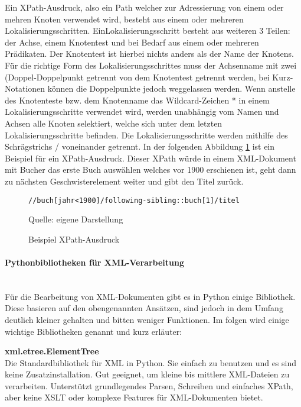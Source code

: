 Ein XPath-Ausdruck, also ein Path welcher zur Adressierung von einem oder mehren Knoten verwendet wird,
besteht aus einem oder mehreren Lokalisierungsschritten.
EinLokalisierungsschritt besteht aus weiteren 3 Teilen: der Achse, einem Knotentest und bei Bedarf aus einem oder mehreren Prädikaten.
Der Knotentest ist hierbei nichts anders als der Name der Knotens.
Für die richtige Form des Lokalisierungsschrittes muss der Achsenname mit zwei
(Doppel-Doppelpunkt getrennt von dem Knotentest getrennt werden, bei Kurz-Notationen können die Doppelpunkte jedoch weggelassen werden.
Wenn anstelle des Knotenteste bzw.
dem Knotenname das Wildcard-Zeichen * in einem Lokalisierungsschritte verwendet wird,
werden unabhängig vom Namen und Achsen alle Knoten selektiert, welche sich unter dem letzten Lokalisierungsschritte befinden.
Die Lokalisierungsschritte werden mithilfe des Schrägstrichs / voneinander getrennt. \cite*{XPath2025}
In der folgenden Abbildung \ref{fig: XPath-Ausdruck} ist ein Beispiel für ein XPath-Ausdruck.
Dieser XPath würde in einem XML-Dokument mit Bucher das erste Buch auswählen welches vor 1900 erschienen ist, geht dann
zu nächsten Geschwisterelement weiter und gibt den Titel zurück.


\begin{figure}[H]
\centering
\begin{minipage}{0.95\textwidth}
\begin{lstlisting}[language=XPath]
//buch[jahr<1900]/following-sibling::buch[1]/titel
\end{lstlisting}
\end{minipage}
\caption{Beispiel XPath-Ausdruck}
\label{fig: XPath-Ausdruck}
    {Quelle: eigene Darstellung}
\end{figure}


\paragraph{Pythonbibliotheken für XML-Verarbeitung}\\
Für die Bearbeitung von \ac{XML}-Dokumenten gibt es in Python einige Bibliothek.
Diese basieren auf den obengenannten Ansätzen, sind jedoch in dem Umfang deutlich kleiner gehalten und bitten weniger Funktionen.
Im folgen wird einige wichtige Bibliotheken genannt und kurz erläuter:

\textbf{xml.etree.ElementTree}\\
Die Standardbibliothek für XML in Python.
Sie einfach zu benutzen und es sind keine Zusatzinstallation.
Gut geeignet, um kleine bis mittlere XML-Dateien zu verarbeiten.
Unterstützt grundlegendes Parsen, Schreiben und einfaches XPath, aber keine \ac{XSLT} oder komplexe Features für \ac{XML}-Dokumenten bietet.\cite*{ElementTree2025}

